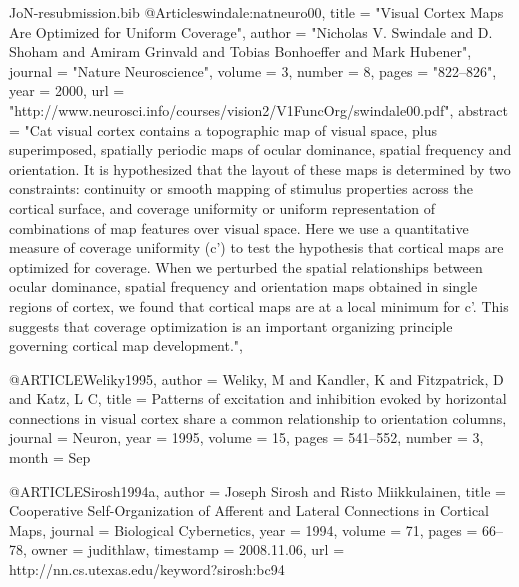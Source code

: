 \documentclass{article}
\begin{document}
\begin{filecontents}{JoN-resubmission.bib}
@Article{swindale:natneuro00,
  title	       = "Visual Cortex Maps Are Optimized for Uniform
                  Coverage",
  author       = "Nicholas V. Swindale and D. Shoham and Amiram
                  Grinvald and Tobias Bonhoeffer and Mark Hubener",
  journal      = "Nature Neuroscience",
  volume       = 3,
  number       = 8,
  pages	       = "822--826",
  year	       = 2000,
  url	       = "http://www.neurosci.info/courses/vision2/V1FuncOrg/swindale00.pdf",
  abstract     = "Cat visual cortex contains a topographic map of
                  visual space, plus superimposed, spatially periodic
                  maps of ocular dominance, spatial frequency and
                  orientation. It is hypothesized that the layout of
                  these maps is determined by two constraints:
                  continuity or smooth mapping of stimulus properties
                  across the cortical surface, and coverage uniformity
                  or uniform representation of combinations of map
                  features over visual space. Here we use a
                  quantitative measure of coverage uniformity (c') to
                  test the hypothesis that cortical maps are optimized
                  for coverage. When we perturbed the spatial
                  relationships between ocular dominance, spatial
                  frequency and orientation maps obtained in single
                  regions of cortex, we found that cortical maps are
                  at a local minimum for c'. This suggests that
                  coverage optimization is an important organizing
                  principle governing cortical map development.",
}

@ARTICLE{Weliky1995,
  author = {Weliky, M and Kandler, K and Fitzpatrick, D and Katz, L C},
  title = {{{P}atterns of excitation and inhibition evoked by horizontal connections
	in visual cortex share a common relationship to orientation columns}},
  journal = {Neuron},
  year = {1995},
  volume = {15},
  pages = {541--552},
  number = {3},
  month = {Sep}
}

@ARTICLE{Sirosh1994a,
  author = {Joseph Sirosh and Risto Miikkulainen},
  title = {Cooperative Self-Organization of Afferent and Lateral Connections
	in Cortical Maps},
  journal = {Biological Cybernetics},
  year = {1994},
  volume = {71},
  pages = {66--78},
  owner = {judithlaw},
  timestamp = {2008.11.06},
  url = {http://nn.cs.utexas.edu/keyword?sirosh:bc94}
}


\end{filecontents}
\end{document}
